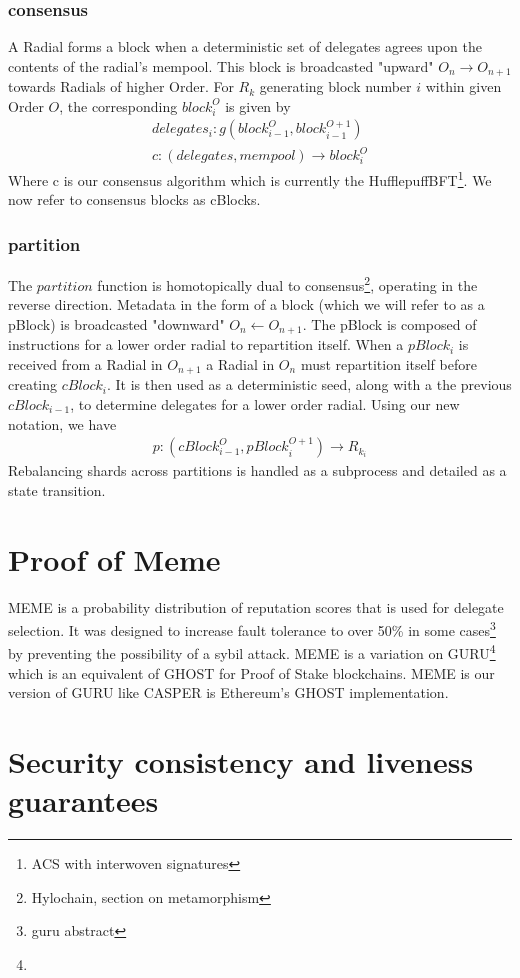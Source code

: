 \documentclass{article}
\begin{document}
\subsubsection{consensus}
A Radial forms a block when a deterministic set of delegates agrees upon the contents of the radial's mempool. This block is broadcasted "upward" $O_n \rightarrow O_{n+1}$ towards Radials of higher Order. For $R_k$ generating block number $i$ within given Order $O$, the corresponding $block^{O}_i$ is given by
\begin{align*}
delegates_i: g(block^{O}_{i-1}, block^{O+1}_{i-1}) \\
c: (delegates, mempool) \rightarrow block^{O}_i
\end{align*}
Where c is our consensus algorithm which is currently the HufflepuffBFT\footnote{ACS with interwoven signatures}. We now refer to consensus blocks as cBlocks.

\subsubsection{partition}
The $partition$ function is homotopically dual to consensus\footnote{Hylochain, section on metamorphism}, operating in the reverse direction. Metadata in the form of a block (which we will refer to as a pBlock) is broadcasted "downward" $O_{n} \leftarrow O_{n+1}$. The pBlock is composed of instructions for a lower order radial to repartition itself. When a $pBlock_{i}$ is received from a Radial in $O_{n+1}$ a Radial in $O_{n}$ must repartition itself before creating $cBlock_{i}$. It is then used as a deterministic seed, along with a the previous  $cBlock_{i-1}$, to determine delegates for a lower order radial.  Using our new notation, we have
\begin{align*}
p: (cBlock^{O}_{i-1}, pBlock^{O+1}_{i}) \rightarrow R_{k_i}
\end{align*}
Rebalancing shards across partitions is handled as a subprocess and detailed as a state transition.

\section{Proof of Meme}
MEME is a probability distribution of reputation scores that is used for delegate selection. It was designed to increase fault tolerance to over 50\% in some cases\footnote{guru abstract} by preventing the possibility of a sybil attack. MEME is a variation on GURU\footnote{} which is an equivalent of GHOST for Proof of Stake blockchains. MEME is our version of GURU like CASPER is Ethereum's GHOST implementation.

\section{Security consistency and liveness guarantees}



\end{document}
